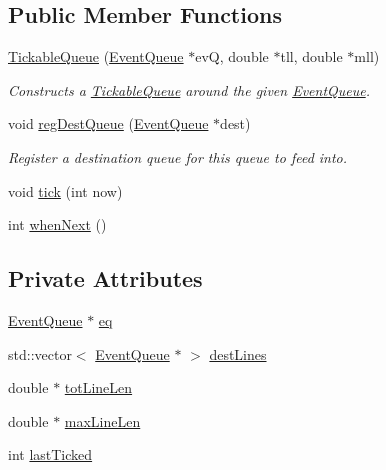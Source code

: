 \subsection*{Public Member Functions}
\begin{DoxyCompactItemize}
\item 
\hyperlink{class_tickable_queue_ae4bc32b25ba1dc036173444df9c92d91}{Tickable\+Queue} (\hyperlink{class_event_queue}{Event\+Queue} $\ast$evQ, double $\ast$tll, double $\ast$mll)
\begin{DoxyCompactList}\small\item\em Constructs a \hyperlink{class_tickable_queue}{Tickable\+Queue} around the given \hyperlink{class_event_queue}{Event\+Queue}. \end{DoxyCompactList}\item 
void \hyperlink{class_tickable_queue_ac0a0fb1ed5312a1e93f471ae12e0238e}{reg\+Dest\+Queue} (\hyperlink{class_event_queue}{Event\+Queue} $\ast$dest)
\begin{DoxyCompactList}\small\item\em Register a destination queue for this queue to feed into. \end{DoxyCompactList}\item 
void \hyperlink{class_tickable_queue_afabd7085cb5f7cba4286246d69f42211}{tick} (int now)
\item 
int \hyperlink{class_tickable_queue_a7ce766623b9b1610147b920018de5066}{when\+Next} ()
\end{DoxyCompactItemize}
\subsection*{Private Attributes}
\begin{DoxyCompactItemize}
\item 
\hyperlink{class_event_queue}{Event\+Queue} $\ast$ \hyperlink{class_tickable_queue_ad14bee370bdfb8db2550fa3fd7a11a3a}{eq}
\item 
std\+::vector$<$ \hyperlink{class_event_queue}{Event\+Queue} $\ast$ $>$ \hyperlink{class_tickable_queue_a44b1ef6bc662fc500030f35a4f10e73a}{dest\+Lines}
\item 
double $\ast$ \hyperlink{class_tickable_queue_a29b6a86071a7c56798a5a8633435260e}{tot\+Line\+Len}
\item 
double $\ast$ \hyperlink{class_tickable_queue_a86b7e60ef45f0405279725058820f4a8}{max\+Line\+Len}
\item 
int \hyperlink{class_tickable_queue_a1bab2d5f40fb2a9f8ba171239843f422}{last\+Ticked}
\end{DoxyCompactItemize}


